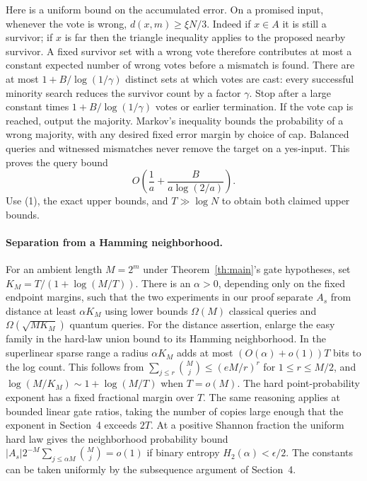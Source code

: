 Here is a uniform bound on the accumulated error. On a promised input, whenever the vote is wrong, $d(x,m)\ge\xi N/3$. Indeed if $x\in A$ it is still a survivor; if $x$ is far then the triangle inequality applies to the proposed nearby survivor. A fixed survivor set with a wrong vote therefore contributes at most a constant expected number of wrong votes before a mismatch is found. There are at most $1+B/\log(1/\gamma)$ distinct sets at which votes are cast: every successful minority search reduces the survivor count by a factor $\gamma$. Stop after a large constant times $1+B/\log(1/\gamma)$ votes or earlier termination. If the vote cap is reached, output the majority. Markov's inequality bounds the probability of a wrong majority, with any desired fixed error margin by choice of cap. Balanced queries and witnessed mismatches never remove the target on a yes-input. This proves the query bound
\[
 O\!\left(\frac1a+\frac{B}{a\log(2/a)}\right).
\]
Use (1), the exact upper bounds, and $T\gg\log N$ to obtain both claimed upper bounds.

\paragraph{Separation from a Hamming neighborhood.}
For an ambient length $M=2^m$ under Theorem~\ref{th:main}'s gate hypotheses, set $K_M=T/(1+\log(M/T))$. There is an $\alpha>0$, depending only on the fixed endpoint margins, such that the two experiments in our proof separate $A_s$ from distance at least $\alpha K_M$ using lower bounds $\Omega(M)$ classical queries and $\Omega(\sqrt{M K_M})$ quantum queries. For the distance assertion, enlarge the easy family in the hard-law union bound to its Hamming neighborhood. In the superlinear sparse range a radius $\alpha K_M$ adds at most $(O(\alpha)+o(1))T$ bits to the log count. This follows from $\sum_{j\le r}\binom Mj\le (eM/r)^r$ for $1\le r\le M/2$, and $\log(M/K_M)\sim1+\log(M/T)$ when $T=o(M)$. The hard point-probability exponent has a fixed fractional margin over $T$. The same reasoning applies at bounded linear gate ratios, taking the number of copies large enough that the exponent in Section~4 exceeds $2T$. At a positive Shannon fraction the uniform hard law gives the neighborhood probability bound $|A_s|2^{-M}\sum_{j\le\alpha M}\binom Mj=o(1)$ if binary entropy $H_2(\alpha)<\epsilon/2$. The constants can be taken uniformly by the subsequence argument of Section~4.

